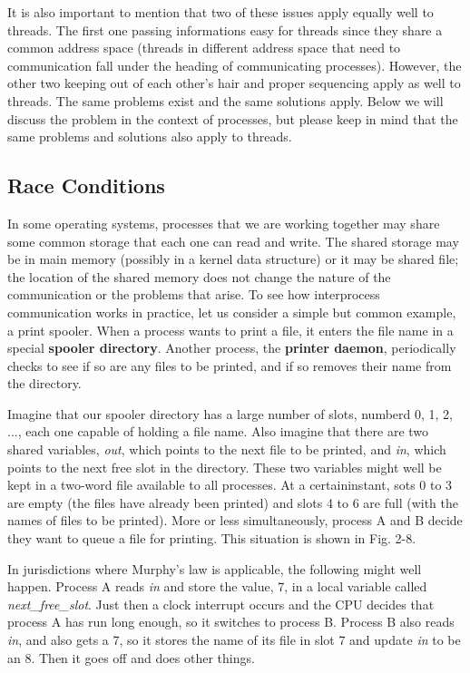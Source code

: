 \documentclass{book}
\newcommand {\kw}  [1] {\textbf{#1}}
\newcommand {\sys} [1] {\textsl{#1}}
\begin{document}
It is also important to mention that two of these issues apply equally well to threads.
The first one passing informations easy for threads since they share a common address space 
(threads in different address space that need to communication fall under the heading of communicating processes).
However, the other two keeping out of each other's hair and proper sequencing apply as well to threads.
The same problems exist and the same solutions apply.
Below we will discuss the problem in the context of processes,
but please keep in mind that the same problems and solutions also apply to threads.

\subsection{Race Conditions}
In some operating systems, processes that we are working together may share some common storage
that each one can read and write.
The shared storage may be in main memory (possibly in a kernel data structure) or it may be shared file;
the location of the shared memory does not change the nature of the communication or the problems that arise.
To see how interprocess communication works in practice, let us consider a simple but common example, a print spooler.
When a process wants to print a file, it enters the file name in a special \kw{spooler directory}.
Another process, the \kw{printer daemon}, periodically checks to see if so are any files to be printed,
and if so removes their name from the directory.

Imagine that our spooler directory has a large number of slots, numberd 0, 1, 2, ..., 
each one capable of holding a file name.
Also imagine that there are two shared variables, 
\sys{out}, which points to the next file to be printed,
and \sys{in}, which points to the next free slot in the directory.
These two variables might well be kept in a two-word file available to all processes.
At a certaininstant, sots 0 to 3 are empty (the files have already been printed) and slots 4 to 6 are full (with the names of files to be printed).
More or less simultaneously, process A and B decide they want to queue a file for printing.
This situation is shown in Fig. 2-8.

In jurisdictions where Murphy's law is applicable, the following might well happen.
Process A reads \sys{in} and store the value, 7, in a local variable called \sys{next\_free\_slot}.
Just then a clock interrupt occurs and the CPU decides that process A has run long enough, 
so it switches to process B.
Process B also reads \sys{in}, and also gets a 7, so it stores the name of its file in slot 7 and update \sys{in} to be an 8.
Then it goes off and does other things.
\end{document}
